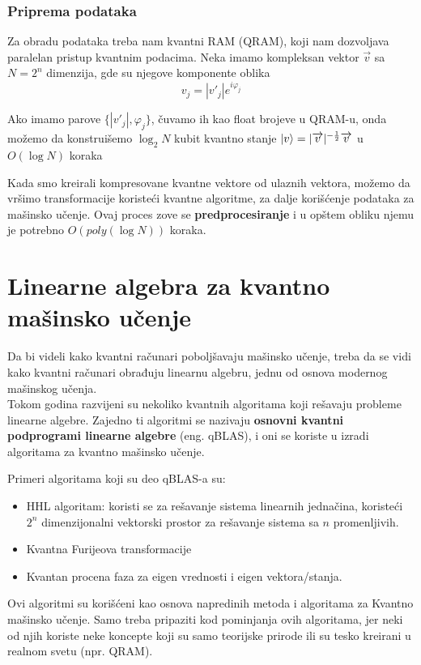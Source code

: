 \documentclass[12pt, letterpaper, oneside]{article}
\begin{document}
\subsubsection{Priprema podataka}
Za obradu podataka treba nam kvantni RAM (QRAM), koji nam dozvoljava paralelan pristup kvantnim podacima.
Neka imamo kompleksan vektor $\overrightarrow{v}$ sa $N=2^n$ dimenzija, gde su njegove komponente oblika 
\[
    v_j = |v'_j|e^{i\varphi_j}
\]

Ako imamo parove $\{|v'_j|,\varphi_j\}$, čuvamo ih kao float brojeve u QRAM-u, onda možemo da konstruišemo
$\log_{2}N$ kubit kvantno stanje $\ket{v} = |\overrightarrow{v}|^{-\frac{1}{2}}\overrightarrow{v}$ u $O(\log N)$ koraka

Kada smo kreirali kompresovane kvantne vektore od ulaznih vektora, možemo da vršimo transformacije koristeći kvantne algoritme, za dalje korišćenje podataka za mašinsko učenje.
Ovaj proces zove se \textbf{predprocesiranje} i u opštem obliku njemu je potrebno $O(poly(\log{}N))$ koraka. \cite{lloyd2013quantum}


\section{Linearne algebra za kvantno mašinsko učenje}
Da bi videli kako kvantni računari poboljšavaju mašinsko učenje, treba da se vidi kako kvantni računari obrađuju linearnu algebru, jednu od osnova modernog mašinskog učenja. \\
Tokom godina razvijeni su nekoliko kvantnih algoritama koji rešavaju probleme linearne algebre.
Zajedno ti algoritmi se nazivaju \textbf{osnovni kvantni podprogrami linearne algebre} (eng. qBLAS), i oni se koriste u izradi algoritama za kvantno mašinsko učenje.

Primeri algoritama koji su deo qBLAS-a su: 
\begin{itemize}
    \item HHL algoritam: koristi se za rešavanje sistema linearnih jednačina, koristeći $2^n$ dimenzijonalni vektorski prostor
        za rešavanje sistema sa $n$ promenljivih. \cite{Quantum_machine_learning}
    \item Kvantna Furijeova transformacije \cite{Classical&quantum_info_Fourie_Phase}
    \item Kvantan procena faza za eigen vrednosti i eigen vektora/stanja. \cite{Classical&quantum_info_Fourie_Phase}
\end{itemize}
Ovi algoritmi su korišćeni kao osnova napredinih metoda i algoritama za Kvantno mašinsko učenje.
Samo treba pripaziti kod pominjanja ovih algoritama, jer neki od njih koriste neke koncepte koji su samo teorijske prirode ili su tesko kreirani u realnom svetu (npr. QRAM).
\end{document}
